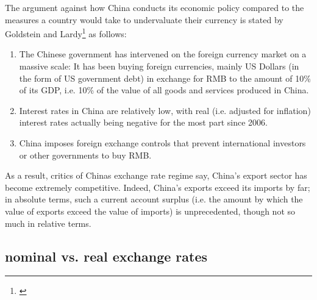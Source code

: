 \documentclass[11pt]{article}
\begin{document}
%
%

The argument against how China conducts its economic policy compared to 
the measures a country would take to undervaluate their currency is 
stated by Goldstein and Lardy\footnote{\cite[pp.  
40]{GoldsteinLardy2008}} as follows:

\begin{enumerate}
\item{The Chinese government has intervened on the foreign currency 
		market on a massive scale: It has been buying foreign 
		currencies, mainly US Dollars (in the form of US government 
		debt) in exchange for RMB to the amount of 10\% of its GDP, i.e. 
		10\% of the value of all goods and services produced in China.} 
\item{Interest rates in China are relatively low, with real (i.e. adjusted for inflation) interest rates actually being negative for the most part since 2006.} %
\item{China imposes foreign exchange controls that prevent international investors or other governments to buy RMB.}%
\end{enumerate}

As a result, critics of Chinas exchange rate regime say, China's export sector has become extremely competitive. Indeed, China's exports exceed its imports by far; in absolute terms, such a current account surplus (i.e. the amount by which the value of exports exceed the value of imports) is unprecedented, though not so much in relative terms. %

 
\subsection{nominal vs. real exchange rates}
\end{document}
